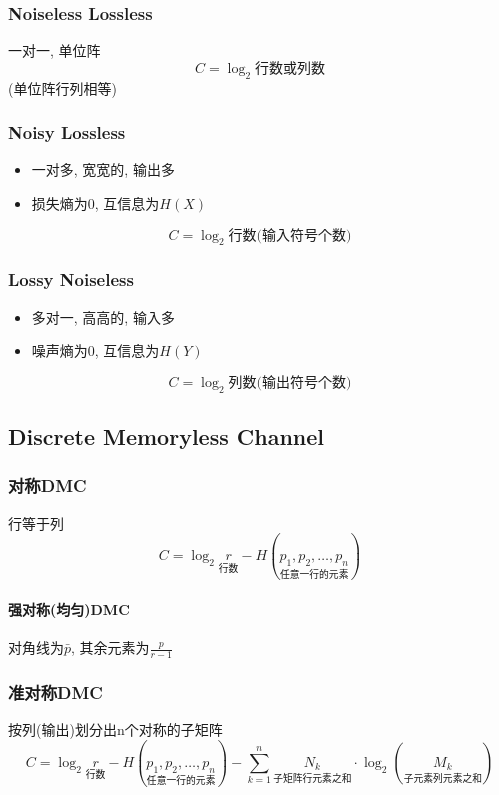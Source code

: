 \documentclass[a4paper]{report}
\begin{document}
\subsubsection{Noiseless Lossless}
一对一, 单位阵
$$C=\log_2{\text{行数或列数}}$$
(单位阵行列相等)
\subsubsection{Noisy Lossless}
\begin{itemize}
  \item 一对多, 宽宽的, 输出多
  \item 损失熵为0, 互信息为$H(X)$
\end{itemize}
$$C=\log_2{\text{行数(输入符号个数)}}$$
\subsubsection{Lossy Noiseless}
\begin{itemize}
  \item 多对一, 高高的, 输入多
  \item 噪声熵为0, 互信息为$H(Y)$
\end{itemize}
$$C=\log_2{\text{列数(输出符号个数)}}$$
\subsection{Discrete Memoryless Channel}
\subsubsection{对称DMC}
行等于列
$$C=\log_2{\underset{\text{行数}}{r} }-H(\underset{\text{任意一行的元素}}{p_1,p_2,\dots ,p_n})$$
\paragraph{强对称(均匀)DMC}
对角线为$\bar{p}$, 其余元素为$\frac{p}{r-1}$

\subsubsection{准对称DMC}
按列(输出)划分出n个对称的子矩阵
$$C=\log_2{\underset{\text{行数}}{r} }
-H(\underset{\text{任意一行的元素}}{p_1,p_2,\dots ,p_n})
-\displaystyle\sum_{k=1}^{n}
\underset{\text{子矩阵行元素之和}}{N_k}\cdot
\log_2({\underset{\text{子元素列元素之和}}{M_k}})$$
\end{document}
